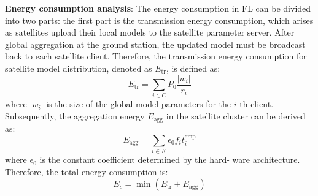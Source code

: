\textbf{Energy consumption analysis}:
The energy consumption in FL can be divided into two parts: the first part is the transmission energy consumption, which arises as satellites upload their local models to the satellite parameter server.  After global aggregation at the ground station, the updated model must be broadcast back to each satellite client. Therefore, the transmission energy consumption for satellite model distribution, denoted as $E_{\text{tr}}$, is defined as:
\begin{equation}
E_{\text{tr}} = \sum_{i \in C} P_0 \frac{|w_i|}{r_i}
\end{equation}
where $|w_i|$ is the size of the global model parameters for the $i$-th client. Subsequently, the aggregation energy \(E_{\text{agg}}\) in the satellite cluster can be derived as:
\begin{equation}
E_{\text{agg}} = \sum_{i \in K} \epsilon_0 f_i t_i^{\text{cmp}}
\end{equation}
where $\epsilon_0$ is the constant coefficient determined by the hard-
ware architecture. Therefore, the total energy consumption is: %
\begin{equation}
E_c= \min ( E_{\text{tr}} + E_{\text{agg}}) 
\label{eq:energy}
\end{equation}


\begin{comment}
s.t.
\begin{subequations}

\begin{equation}
x_a \in \{0, 1\}, \ \forall a \in A,
\end{equation}
\begin{equation}
y_v \in \{0, 1\}, \ \forall v \in V,
\end{equation}

\end{subequations}

\begin{equation}
r \in \{v_{\text{l,T}} | l \in L\},
\end{equation}

\begin{equation}
y_r = 1,
\end{equation}

\begin{equation}
x_a \in \{0, 1\}, \ \forall a \in A,
\end{equation}

\begin{equation}
y_v \in \{0, 1\}, \ \forall v \in V,
\end{equation}

\begin{equation}
x_a \leq y_v, \ x_a \leq y_{v'}, \ \forall a = (v, v') \in A.
\end{equation}
\end{comment}

